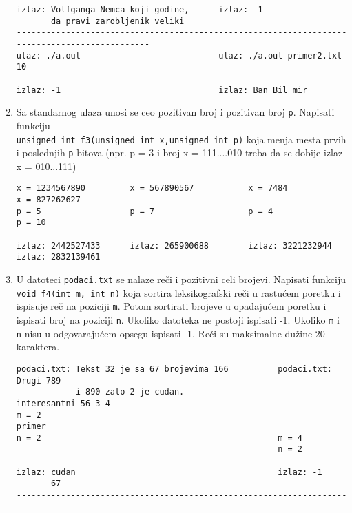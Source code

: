 \begin{enumerate}
\begin{small}
\begin{verbatim}
izlaz: Volfganga Nemca koji godine,      izlaz: -1
       da pravi zarobljenik veliki
----------------------------------------------------------------------------------------------
ulaz: ./a.out                            ulaz: ./a.out primer2.txt 10

izlaz: -1                                izlaz: Ban Bil mir
\end{verbatim}
\end{small}


\item Sa standarnog ulaza unosi se ceo pozitivan broj i pozitivan broj \verb|p|. Napisati funkciju \\
\verb|unsigned int f3(unsigned int x,unsigned int p)| koja menja
mesta prvih i poslednjih \verb|p| bitova (npr. p = 3 i broj x = 111....010 treba da se dobije izlaz
x = 010...111)


\begin{small}
\begin{verbatim}
x = 1234567890         x = 567890567           x = 7484                 x = 827262627
p = 5                  p = 7                   p = 4                    p = 10

izlaz: 2442527433      izlaz: 265900688        izlaz: 3221232944        izlaz: 2832139461
\end{verbatim}
\end{small}


\item U datoteci \verb|podaci.txt| se nalaze re\v ci i pozitivni celi brojevi. Napisati funkciju
\verb|void f4(int m, int n)| koja sortira leksikografski re\v ci u rastu\'cem
poretku i  ispisuje re\v c na poziciji \verb|m|. Potom sortirati brojeve u opadaju\'cem poretku
i ispisati broj na poziciji \verb|n|. Ukoliko datoteka ne postoji ispisati -1. Ukoliko \verb|m|
i \verb|n| nisu u odgovaraju\'cem opsegu ispisati -1. Re\v ci su maksimalne du\v zine 20 karaktera.


\begin{small}
\begin{verbatim}
podaci.txt: Tekst 32 je sa 67 brojevima 166          podaci.txt: Drugi 789
            i 890 zato 2 je cudan.                               interesantni 56 3 4
m = 2                                                            primer
n = 2                                                m = 4
                                                     n = 2

izlaz: cudan                                         izlaz: -1
       67
------------------------------------------------------------------------------------------------


\end{verbatim}
\end{small}
\end{enumerate}
